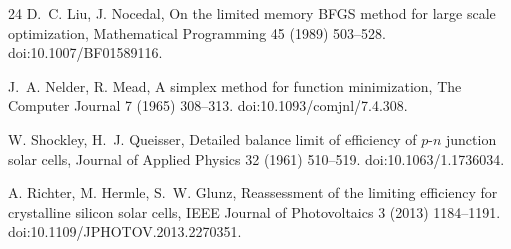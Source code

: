 \documentclass[preprint,12pt]{elsarticle}
\begin{document}
\begin{thebibliography}{24}
 D.~C. Liu, J. Nocedal, On the limited memory BFGS method
for large scale optimization, Mathematical Programming 45 (1989) 503--528.
doi:10.1007/BF01589116.

 J.~A. Nelder, R. Mead, A simplex method for function
minimization, The Computer Journal 7 (1965) 308--313.
doi:10.1093/comjnl/7.4.308.

 W. Shockley, H.~J. Queisser, Detailed balance limit of
efficiency of $p$-$n$ junction solar cells, Journal of Applied Physics 32
(1961) 510--519. doi:10.1063/1.1736034.

 A. Richter, M. Hermle, S.~W. Glunz, Reassessment of the
limiting efficiency for crystalline silicon solar cells, IEEE Journal of
Photovoltaics 3 (2013) 1184--1191. doi:10.1109/JPHOTOV.2013.2270351.

\end{thebibliography}
\end{document}
